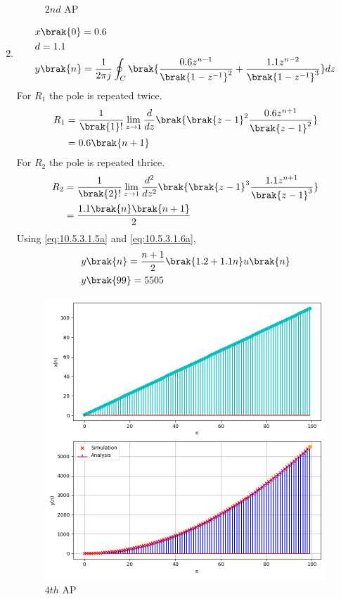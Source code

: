 \documentclass[journal,12pt,twocolumn]{IEEEtran}
\theoremstyle{remark}
\begin{document}
\begin{enumerate}[label=(\alph*)]
\begin{figure}[h!]
        \caption{$2nd$ AP}
    \end{figure}
    \item \begin{align}
        &x\brak{0}=0.6 \\
        &d=1.1 \\
        &y\brak{n}=\frac{1}{2\pi j}\oint_{C}\brak{\dfrac{0.6z^{n-1}}{\brak{1-z^{-1}}^2} + \dfrac{1.1z^{n-2}}{\brak{1-z^{-1}}^{3}}}dz
    \end{align}
    For $R_1$ the pole is repeated twice.
\begin{align}
    R_1&=\frac{1}{\brak {1}!}\lim\limits_{z\to 1}\frac{d}{dz}\brak {{\brak{z-1}}^{2}\frac{0.6z^{n+1}}{{\brak{z-1}}^2}}\\
    &=0.6\brak{n+1}\label{eq:10.5.3.1.5a}
\end{align}
    For $R_2$ the pole is repeated thrice.
\begin{align}
    R_2&=\frac{1}{\brak {2}!}\lim\limits_{z\to 1}\frac{d^{2}}{dz^{2}}\brak {{\brak{z-1}}^{3}\frac{1.1z^{n+1}}{{\brak{z-1}}^3}}\\
    &=\frac{1.1\brak{n}\brak{n+1}}{2}\label{eq:10.5.3.1.6a}
\end{align}
Using \eqref{eq:10.5.3.1.5a} and \eqref{eq:10.5.3.1.6a},
\begin{align}
    &y\brak{n}=\dfrac{n+1}{2}\brak{1.2+1.1n}u\brak{n}\\
    &y\brak{99}=5505
\end{align}
    \begin{figure}[h!]
        \centering
        \includegraphics[width=\columnwidth]{ncert-maths/10/5/3/1/figs/plt3.png}
        \caption{$4th$ AP}
    \end{figure}


\end{enumerate}
\end{document}
